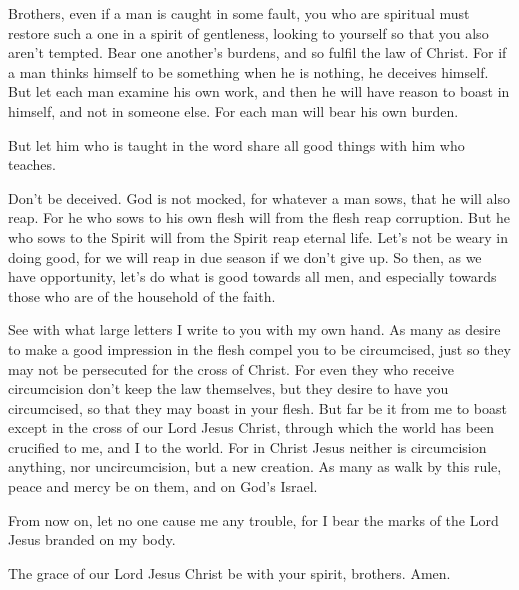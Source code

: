  Brothers, even if a man is caught in some fault, you who
are spiritual must restore such a one in a spirit of gentleness, looking
to yourself so that you also aren't tempted.  Bear one
another's burdens, and so fulfil the law of Christ.  For if
a man thinks himself to be something when he is nothing, he deceives
himself.  But let each man examine his own work, and then he
will have reason to boast in himself, and not in someone else.
 For each man will bear his own burden.

 But let him who is taught in the word share all good things
with him who teaches.

 Don't be deceived. God is not mocked, for whatever a man
sows, that he will also reap.  For he who sows to his own
flesh will from the flesh reap corruption. But he who sows to the Spirit
will from the Spirit reap eternal life.  Let's not be weary
in doing good, for we will reap in due season if we don't give up.
 So then, as we have opportunity, let's do what is good
towards all men, and especially towards those who are of the household
of the faith.

 See with what large letters I write to you with my own
hand.  As many as desire to make a good impression in the
flesh compel you to be circumcised, just so they may not be persecuted
for the cross of Christ.  For even they who receive
circumcision don't keep the law themselves, but they desire to have you
circumcised, so that they may boast in your flesh.  But far
be it from me to boast except in the cross of our Lord Jesus Christ,
through which the world has been crucified to me, and I to the world.
 For in Christ Jesus neither is circumcision anything, nor
uncircumcision, but a new creation.  As many as walk by
this rule, peace and mercy be on them, and on God's Israel.

 From now on, let no one cause me any trouble, for I bear
the marks of the Lord Jesus branded on my body.

 The grace of our Lord Jesus Christ be with your spirit,
brothers. Amen.
